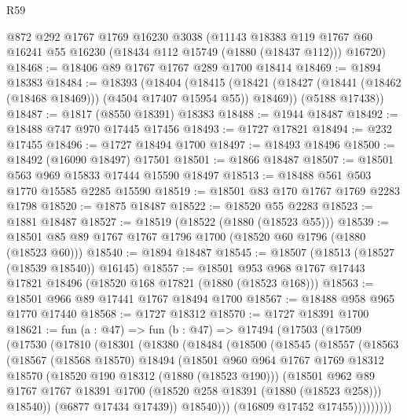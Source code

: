 \begin{lexlean}{R59}
\begin{coremodule}
    @872
    @292
    @1767
    @1769
    @16230
    @3038
    (@11143
      @18383
      @119
      @1767
      @60
      @16241
      @55
      @16230
      (@18434 @112 @15749 (@1880 (@18437 @112)))
      @16720)
@18468 := @18406 @89 @1767 @1767 @289 @1700 @18414
@18469 := @1894 @18383
@18484 := @18393
    (@18404
      (@18415 (@18421 (@18427 (@18441 (@18462 (@18468 @18469))) (@4504 @17407 @15954 @55)) @18469))
      (@5188 @17438))
@18487 := @1817 (@8550 @18391) @18383
@18488 := @1944 @18487
@18492 := @18488 @747 @970 @17445 @17456
@18493 := @1727 @17821
@18494 := @232 @17455
@18496 := @1727 @18494 @1700
@18497 := @18493 @18496
@18500 := @18492 (@16090 @18497) @17501
@18501 := @1866 @18487
@18507 := @18501 @563 @969 @15833 @17444 @15590 @18497
@18513 := @18488 @561 @503 @1770 @15585 @2285 @15590
@18519 := @18501 @83 @170 @1767 @1769 @2283 @1798
@18520 := @1875 @18487
@18522 := @18520 @55 @2283
@18523 := @1881 @18487
@18527 := @18519 (@18522 (@1880 (@18523 @55)))
@18539 := @18501 @85 @89 @1767 @1767 @1796 @1700 (@18520 @60 @1796 (@1880 (@18523 @60)))
@18540 := @1894 @18487
@18545 := @18507 (@18513 (@18527 (@18539 @18540)) @16145)
@18557 := @18501 @953 @968 @1767 @17443 @17821 @18496 (@18520 @168 @17821 (@1880 (@18523 @168)))
@18563 := @18501 @966 @89 @17441 @1767 @18494 @1700
@18567 := @18488 @958 @965 @1770 @17440
@18568 := @1727 @18312
@18570 := @1727 @18391 @1700
@18621 := fun (a : @47) =>
  fun (b : @47) =>
  @17494
    (@17503
      (@17509
        (@17530
          (@17810
            (@18301
              (@18380
                (@18484
                  (@18500
                    (@18545
                      (@18557
                        (@18563
                          (@18567
                            (@18568 @18570)
                            @18494
                            (@18501
                              @960
                              @964
                              @1767
                              @1769
                              @18312
                              @18570
                              (@18520 @190 @18312 (@1880 (@18523 @190)))
                              (@18501
                                @962
                                @89
                                @1767
                                @1767
                                @18391
                                @1700
                                (@18520 @258 @18391 (@1880 (@18523 @258)))
                                @18540))
                            (@6877 @17434 @17439))
                          @18540)))
                    (@16809 @17452 @17455)))))))))

\end{coremodule}
\end{lexlean}

